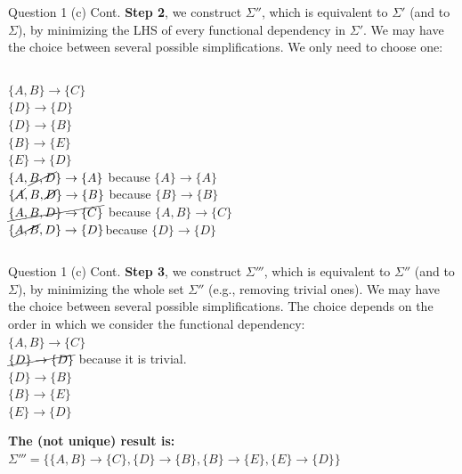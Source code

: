 \begin{frame}[fragile]{Question 1 (c) Cont.}
	\textbf{Step 2}, we construct $\Sigma''$, which is equivalent to $\Sigma'$ (and to $\Sigma$), by minimizing the LHS of every functional dependency in $\Sigma'$. We may have the choice between several possible simplifications. We only need to choose one:\\\vspace{3pt}
	\begin{columns}[t]
		$\{A, B\} \rightarrow \{C\}$\\
		$\{D\} \rightarrow \{D\}$\\
		$\{D\} \rightarrow \{B\}$\\
		$\{B\} \rightarrow \{E\}$\\
		$\{E\} \rightarrow \{D\}$\\
		$\{A, \cancel{B, D}\} \rightarrow \{A\}$ because $\{A\} \rightarrow \{A\}$\\	
		$\{\cancel{A}, B, \cancel{D}\} \rightarrow \{B\}$ because $\{B\} \rightarrow \{B\}$\\	
		$\cancel{\{A, B, D\} \rightarrow \{C\}}$ because $\{A, B\} \rightarrow \{C\}$\\	
		$\{\cancel{A, B}, D\} \rightarrow \{D\}$because $\{D\} \rightarrow \{D\}$\\
	\end{columns}
\end{frame}

\begin{frame}[fragile]{Question 1 (c) Cont.}
	\textbf{Step 3}, we construct $\Sigma'''$, which is equivalent to $\Sigma''$ (and to $\Sigma$), by minimizing the whole set $\Sigma''$ (e.g., removing trivial ones). We may have the choice between several possible simplifications. The choice depends on the order in which we consider the functional dependency:\\\vspace{3pt}
	$\{A, B\} \rightarrow \{C\}$\\
	$\cancel{\{D\} \rightarrow \{D\}}$ because it is trivial.\\
	$\{D\} \rightarrow \{B\}$\\
	$\{B\} \rightarrow \{E\}$\\
	$\{E\} \rightarrow \{D\}$\\\vspace{3pt}
	
	\textbf{The (not unique) result is:} \\\vspace{3pt}
	$\Sigma'''=\{\{A, B\} \rightarrow \{C\}, \{D\} \rightarrow \{B\}, \{B\} \rightarrow \{E\}, \{E\} \rightarrow \{D\}\}$
\end{frame}

